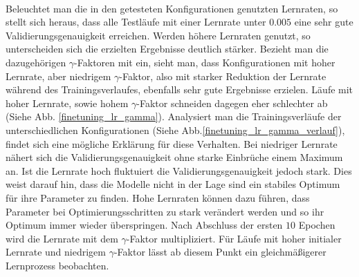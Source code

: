 \\
Beleuchtet man die in den getesteten Konfigurationen genutzten Lernraten, so stellt sich heraus, dass alle Testläufe mit einer Lernrate unter $0.005$ eine sehr gute Validierungsgenauigkeit erreichen. Werden höhere Lernraten genutzt, so unterscheiden sich die erzielten Ergebnisse deutlich stärker. Bezieht man die dazugehörigen $\gamma$-Faktoren mit ein, sieht man, dass Konfigurationen mit hoher Lernrate, aber niedrigem $\gamma$-Faktor, also mit starker Reduktion der Lernrate während des Trainingsverlaufes, ebenfalls sehr gute Ergebnisse erzielen. Läufe mit hoher Lernrate, sowie hohem $\gamma$-Faktor schneiden dagegen eher schlechter ab (Siehe Abb. \ref{finetuning_lr_gamma}). Analysiert man die Trainingsverläufe der unterschiedlichen Konfigurationen (Siehe Abb.\ref{finetuning_lr_gamma_verlauf}), findet sich eine mögliche Erklärung für diese Verhalten. Bei niedriger Lernrate nähert sich die Validierungsgenauigkeit ohne starke Einbrüche einem Maximum an. Ist die Lernrate hoch fluktuiert die Validierungsgenauigkeit jedoch stark. Dies weist darauf hin, dass die Modelle nicht in der Lage sind ein stabiles Optimum für ihre Parameter zu finden. Hohe Lernraten können dazu führen, dass Parameter bei Optimierungsschritten zu stark verändert werden und so ihr Optimum immer wieder überspringen. Nach Abschluss der ersten $10$ Epochen wird die Lernrate mit dem $\gamma$-Faktor multipliziert. Für Läufe mit hoher initialer Lernrate und niedrigem $\gamma$-Faktor lässt ab diesem Punkt ein gleichmäßigerer Lernprozess beobachten. 
